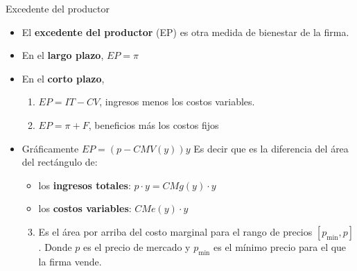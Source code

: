 \documentclass{beamer}
\theoremstyle{definition}
\begin{document}
\begin{frame}{Excedente del productor}
\begin{itemize}
\item El \textbf{excedente del productor} (EP) es otra medida de bienestar de la firma. 
\item En el \textbf{largo plazo}, $EP=\pi$
\item En el \textbf{corto plazo},
\begin{enumerate}[label=\textbf{(\Alph*)}]
    \item $EP=IT-CV$, ingresos menos
los costos variables.
    \item $EP=\pi+F$, beneficios más los costos fijos
    \end{enumerate}
    \item Gráficamente $EP=(p-CMV(y))y$ Es decir que es la diferencia del \'area del rectángulo de:
\begin{itemize}
    \item los \textbf{ingresos totales}: $p\cdot y=CMg(y)\cdot y$
    \item los \textbf{costos variables}: $CMe(y)\cdot y$
\end{itemize}

\begin{enumerate}[label=\textbf{(\Alph*)}]
\setcounter{enumi}{2}
    \item Es el \'area por arriba del costo marginal para el rango de precios  $[p_{\text{min}},p]$. Donde $p$ es el precio de mercado y $p_{\text{min}}$ es el mínimo precio para el que la firma vende.
\end{enumerate}

\end{itemize}
\end{frame}
\end{document}
